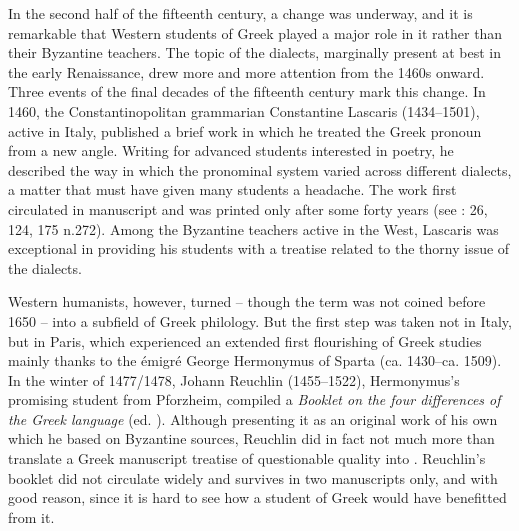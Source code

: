 In the second half of the fifteenth century, a change was underway, and it is remarkable that Western students of Greek played a major role in it rather than their Byzantine teachers. The topic of the dialects, marginally present at best in the early Renaissance, drew more and more attention from the 1460s onward. Three events of the final decades of the fifteenth century mark this change. In 1460, the Constantinopolitan grammarian Constantine Lascaris (1434–1501), active in Italy, published a brief work in which he treated the Greek pronoun from a new angle. Writing for advanced students interested in poetry, he described the way in which the pronominal system varied across different dialects, a matter that must have given many students a headache. The work first circulated in manuscript and was printed only after some forty years (see \citealt{Botley2010}: 26, 124, 175 n.272). Among the Byzantine teachers active in the West, Lascaris was exceptional in providing his students with a treatise related to the thorny issue of the dialects.

Western humanists, however, turned  – though the term was not coined before 1650 – into a subfield of Greek philology. But the first step was taken not in Italy, but in Paris, which experienced an extended first flourishing of Greek studies mainly thanks to the émigré George Hermonymus of Sparta (ca. 1430–ca. 1509). In the winter of 1477/1478, Johann Reuchlin (1455–1522), Hermonymus’s promising student from Pforzheim, compiled a \textit{Booklet on the four differences of the Greek language} (ed. \citealt{VanRooy2014}). Although presenting it as an original work of his own which he based on Byzantine sources, Reuchlin did in fact not much more than translate a Greek manuscript treatise of questionable quality into . Reuchlin’s booklet did not circulate widely and survives in two manuscripts only, and with good reason, since it is hard to see how a student of Greek would have benefitted from it.

